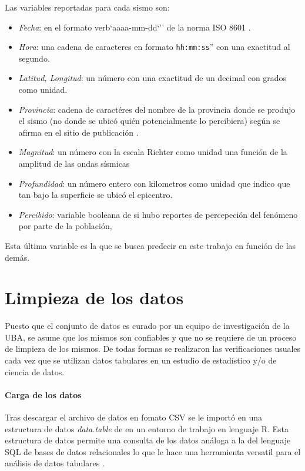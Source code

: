 \documentclass[a4paper]{report}
\begin{document}
Las variables reportadas para cada sismo son:
\begin{itemize}
	\item \emph{Fecha}: en el formato verb`aaaa-mm-dd`'' de la norma ISO 8601 \cite{noauthor_iso_2019}.
	\item \emph{Hora}: una cadena de caracteres en formato \verb`hh:mm:ss`'' con una exactitud al segundo.
	\item \emph{Latitud, Longitud}: un número con una exactitud de un decimal con grados como unidad.
	\item \emph{Provincia}: cadena de caractéres del nombre de la provincia donde se produjo el sismo (no donde se ubicó quién potencialmente lo percibiera) según se afirma en el sitio de publicación \cite[5.1.1]{daniela_parada_ic-datasets-docencia_nodate}.
	\item \emph{Magnitud}: un número con la escala Richter como unidad una función de la amplitud de las ondas sísmicas \cite[sección 4.2.3]{fowler_solid_1990}
	\item \emph{Profundidad}: un número entero con kilometros como unidad que indico que tan bajo la superficie se ubicó el epicentro.
	\item \emph{Percibido}: variable booleana de si hubo reportes de percepeción del fenómeno por parte de la población, 
\end{itemize}
Esta última variable es la que se busca predecir en este trabajo en función de las demás. 



\section{Limpieza de los datos}

Puesto que el conjunto de datos es curado por un equipo de investigación de la UBA, se asume que los mismos son confiables y que no se requiere de un proceso de limpieza de los mismos.
De todas formas se realizaron las verificaciones usuales cada vez que se utilizan datos tabulares en un estudio de estadístico y/o de ciencia de datos.

\paragraph{Carga de los datos}
Tras descargar el archivo de datos en fomato CSV se le importó en una estructura de datos \emph{data.table} de en un entorno de trabajo en lenguaje R.
Esta estructura de datos permite una consulta de los datos análoga a la del lenguaje SQL de bases de datos relacionales lo que le hace una herramienta versatil para el análisis de datos tabulares \cite{noauthor_introduction_2024}.
\end{document}
